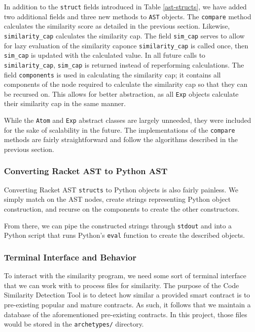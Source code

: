 \documentclass[12pt]{article}
\newcommand{\key}[1]{\texttt{#1}}
\begin{document}
In addition to the \key{struct} fields introduced in Table \ref{ast-structs}, we have added two additional fields and three new methods to \key{AST} objects. The \key{compare} method calculates the similarity score as detailed in the previous section. Likewise, \key{similarity\_cap} calculates the similarity cap. The field \key{sim\_cap} serves to allow for lazy evaluation of the similarity cap\textemdash once \key{similarity\_cap} is called once, then \key{sim\_cap} is updated with the calculated value. In all future calls to \key{similarity\_cap}, \key{sim\_cap} is returned instead of reperforming calculations. The field \key{components} is used in calculating the similarity cap; it contains all components of the node required to calculate the similarity cap so that they can be recursed on. This allows for better abstraction, as all \key{Exp} objects calculate their similarity cap in the same manner.

\hfill

While the \key{Atom} and \key{Exp} abstract classes are largely unneeded, they were included for the sake of scalability in the future. The implementations of the \key{compare} methods are fairly straightforward and follow the algorithms described in the previous section.

\subsubsection{Converting Racket AST to Python AST}

Converting Racket AST \key{structs} to Python objects is also fairly painless. We simply match on the AST nodes, create strings representing Python object construction, and recurse on the components to create the other constructors. 

\hfill

From there, we can pipe the constructed strings through \key{stdout} and into a Python script that runs Python's \key{eval} function to create the described objects.

\subsubsection{Terminal Interface and Behavior}

To interact with the similarity program, we need some sort of terminal interface that we can work with to process files for similarity. The purpose of the Code Similarity Detection Tool is to detect how similar a provided smart contract is to pre-existing popular and mature contracts. As such, it follows that we maintain a database of the aforementioned pre-existing contracts. In this project, those files would be stored in the \key{archetypes/} directory.
\end{document}
